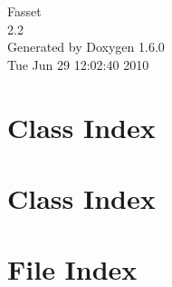 \documentclass[a4paper]{book}
\begin{document}
\hypersetup{pageanchor=false}
\begin{titlepage}
\vspace*{7cm}
\begin{center}
{\Large Fasset \\[1ex]\large 2.2 }\\
\vspace*{1cm}
{\large Generated by Doxygen 1.6.0}\\
\vspace*{0.5cm}
{\small Tue Jun 29 12:02:40 2010}\\
\end{center}
\end{titlepage}
\clearemptydoublepage
{}
\tableofcontents
\clearemptydoublepage
{}
\hypersetup{pageanchor=true}
\chapter{Class Index}

\chapter{Class Index}

\chapter{File Index}

\end{document}
